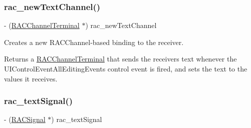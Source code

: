 \subsubsection{\texorpdfstring{rac\+\_\+new\+Text\+Channel()}{rac\_newTextChannel()}\hspace{0.1cm}{\footnotesize\ttfamily [3/3]}}
{\footnotesize\ttfamily -\/ (\mbox{\hyperlink{interface_r_a_c_channel_terminal}{R\+A\+C\+Channel\+Terminal}} $\ast$) rac\+\_\+new\+Text\+Channel \begin{DoxyParamCaption}{ }\end{DoxyParamCaption}}

Creates a new R\+A\+C\+Channel-\/based binding to the receiver.

Returns a \mbox{\hyperlink{interface_r_a_c_channel_terminal}{R\+A\+C\+Channel\+Terminal}} that sends the receiver\textquotesingle{}s text whenever the U\+I\+Control\+Event\+All\+Editing\+Events control event is fired, and sets the text to the values it receives. \mbox{\label{category_u_i_text_field_07_r_a_c_signal_support_08_a08ba059db9a0942f9ff9efd80cde7edd}} 
\subsubsection{\texorpdfstring{rac\+\_\+text\+Signal()}{rac\_textSignal()}\hspace{0.1cm}{\footnotesize\ttfamily [1/3]}}
{\footnotesize\ttfamily -\/ (\mbox{\hyperlink{interface_r_a_c_signal}{R\+A\+C\+Signal}} $\ast$) rac\+\_\+text\+Signal \begin{DoxyParamCaption}{ }\end{DoxyParamCaption}}

